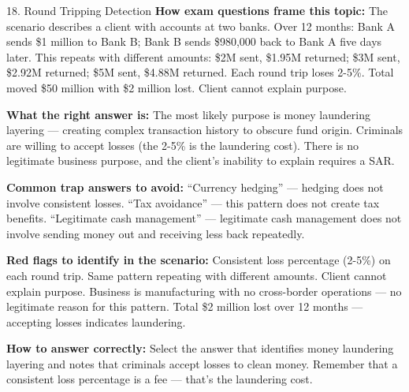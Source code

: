 \documentclass[11pt,a4paper]{beamer}
\begin{document}
	\begin{frame}{18. Round Tripping Detection}
		\tiny
		\noindent\textbf{How exam questions frame this topic:} The scenario describes a client with accounts at two banks. Over 12 months: Bank A sends \$1 million to Bank B; Bank B sends \$980,000 back to Bank A five days later. This repeats with different amounts: \$2M sent, \$1.95M returned; \$3M sent, \$2.92M returned; \$5M sent, \$4.88M returned. Each round trip loses 2-5\%. Total moved \$50 million with \$2 million lost. Client cannot explain purpose.
		
		\vspace{0.1cm}
		\noindent\textbf{What the right answer is:} The most likely purpose is money laundering layering — creating complex transaction history to obscure fund origin. Criminals are willing to accept losses (the 2-5\% is the laundering cost). There is no legitimate business purpose, and the client's inability to explain requires a SAR.
		
		\vspace{0.1cm}
		\noindent\textbf{Common trap answers to avoid:} “Currency hedging” — hedging does not involve consistent losses. “Tax avoidance” — this pattern does not create tax benefits. “Legitimate cash management” — legitimate cash management does not involve sending money out and receiving less back repeatedly.
		
		\vspace{0.1cm}
		\noindent\textbf{Red flags to identify in the scenario:} Consistent loss percentage (2-5\%) on each round trip. Same pattern repeating with different amounts. Client cannot explain purpose. Business is manufacturing with no cross-border operations — no legitimate reason for this pattern. Total \$2 million lost over 12 months — accepting losses indicates laundering.
		
		\vspace{0.1cm}
		\noindent\textbf{How to answer correctly:} Select the answer that identifies money laundering layering and notes that criminals accept losses to clean money. Remember that a consistent loss percentage is a fee — that's the laundering cost.
	\end{frame}
	
\end{document}
